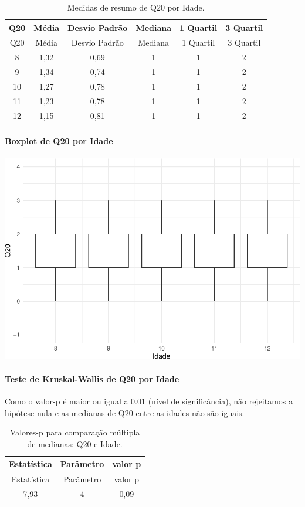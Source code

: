 \documentclass[]{article}
\let\oldparagraph\paragraph
\renewcommand{\paragraph}[1]{\oldparagraph{#1}\mbox{}}
\begin{document}
\begin{longtable}[]{@{}cccccc@{}}
\caption{\label{tab:unnamed-chunk-390}Medidas de resumo de Q20 por Idade.}\tabularnewline
\toprule
Q20 & Média & Desvio Padrão & Mediana & 1 Quartil & 3 Quartil\tabularnewline
\midrule
\endfirsthead
\toprule
Q20 & Média & Desvio Padrão & Mediana & 1 Quartil & 3 Quartil\tabularnewline
\midrule
\endhead
8 & 1,32 & 0,69 & 1 & 1 & 2\tabularnewline
9 & 1,34 & 0,74 & 1 & 1 & 2\tabularnewline
10 & 1,27 & 0,78 & 1 & 1 & 2\tabularnewline
11 & 1,23 & 0,78 & 1 & 1 & 2\tabularnewline
12 & 1,15 & 0,81 & 1 & 1 & 2\tabularnewline
\bottomrule
\end{longtable}

\hypertarget{boxplot-de-q20-por-idade}{%
\paragraph{Boxplot de Q20 por Idade}\label{boxplot-de-q20-por-idade}}

\begin{center}\includegraphics[width=0.75\linewidth]{relatorio_covid19_files/figure-latex/unnamed-chunk-391-1} \end{center}

\hypertarget{teste-de-kruskal-wallis-de-q20-por-idade}{%
\paragraph{Teste de Kruskal-Wallis de Q20 por Idade}\label{teste-de-kruskal-wallis-de-q20-por-idade}}

Como o valor-p é maior ou igual a 0.01 (nível de significância), não rejeitamos a hipótese nula e as medianas de Q20 entre as idades não são iguais.

\begin{longtable}[]{@{}ccc@{}}
\caption{\label{tab:unnamed-chunk-393}Valores-p para comparação múltipla de medianas: Q20 e Idade.}\tabularnewline
\toprule
Estatística & Parâmetro & valor p\tabularnewline
\midrule
\endfirsthead
\toprule
Estatística & Parâmetro & valor p\tabularnewline
\midrule
\endhead
7,93 & 4 & 0,09\tabularnewline
\bottomrule
\end{longtable}
\end{document}
